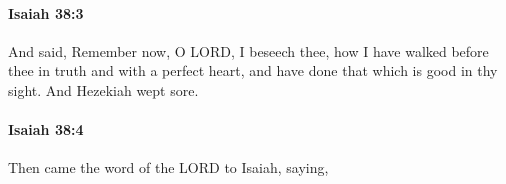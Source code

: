		\paragraph{Isaiah 38:3} %
			\label{ISAIAH-38-3}

			And said, Remember now, O LORD, I beseech thee, how I have walked before thee in truth and with a perfect heart, and have done that which is good in thy sight. And Hezekiah wept sore.


		\paragraph{Isaiah 38:4} %
			\label{ISAIAH-38-4}

			Then came the word of the LORD to Isaiah, saying,


